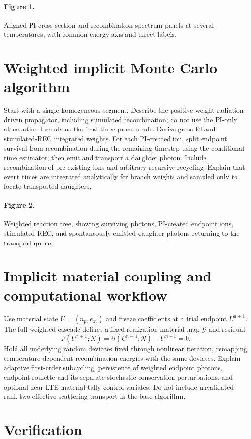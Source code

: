 \documentclass[11pt]{article}
\begin{document}
\paragraph{Figure 1.} Aligned PI-cross-section and recombination-spectrum panels at several temperatures, with common energy axis and direct labels.
\section{Weighted implicit Monte Carlo algorithm}
Start with a single homogeneous segment. Describe the positive-weight radiation-driven propagator, including stimulated recombination; do not use the PI-only attenuation formula as the final three-process rule. Derive gross PI and stimulated-REC integrated weights. For each PI-created ion, split endpoint survival from recombination during the remaining timestep using the conditional time estimator, then emit and transport a daughter photon. Include recombination of pre-existing ions and arbitrary recursive recycling. Explain that event times are integrated analytically for branch weights and sampled only to locate transported daughters.
\paragraph{Figure 2.} Weighted reaction tree, showing surviving photons, PI-created endpoint ions, stimulated REC, and spontaneously emitted daughter photons returning to the transport queue.
\section{Implicit material coupling and computational workflow}
Use material state $U=(n_p,e_m)$ and freeze coefficients at a trial endpoint $U^{n+1}$. The full weighted cascade defines a fixed-realization material map $\mathcal G$ and residual
\begin{equation}
F(U^{n+1};\mathcal R)=\mathcal G(U^{n+1};\mathcal R)-U^{n+1}=0.
\end{equation}
Hold all underlying random deviates fixed through nonlinear iteration, remapping temperature-dependent recombination energies with the same deviates. Explain adaptive first-order subcycling, persistence of weighted endpoint photons, endpoint roulette and its separate stochastic conservation perturbations, and optional near-LTE material-tally control variates. Do not include unvalidated rank-two effective-scattering transport in the base algorithm.
\section{Verification}
\end{document}
